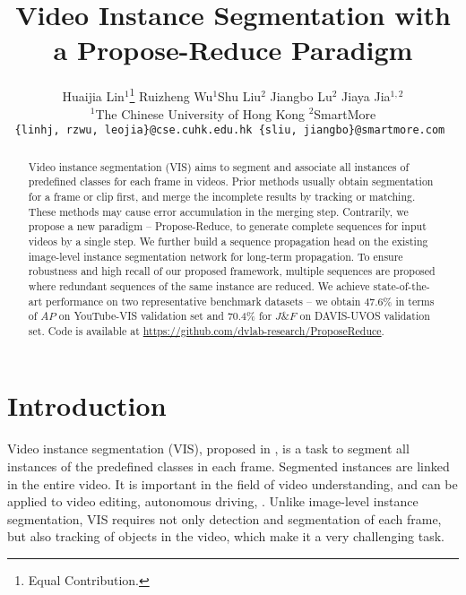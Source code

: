 \documentclass[10pt,twocolumn,letterpaper]{article}
\begin{document}
	\newcommand*\samethanks[1][\value{footnote}]{\footnotemark[#1]}
\title{Video Instance Segmentation with a Propose-Reduce Paradigm}
	
	\author{
	Huaijia Lin$^1$\thanks{Equal Contribution.} \quad Ruizheng Wu$^1$\samethanks \quad Shu Liu$^{2}$ \quad Jiangbo Lu$^{2}$ \quad Jiaya Jia$^{1,2}$  \\
	$^1$The Chinese University of Hong Kong \quad $^2$SmartMore
	\\
	\texttt{\footnotesize \{linhj, rzwu, leojia\}@cse.cuhk.edu.hk \qquad \{sliu, jiangbo\}@smartmore.com }
	}
	


	\maketitle
\ificcvfinal\thispagestyle{empty}\fi
	
\begin{abstract}
		Video instance segmentation (VIS) aims to segment and associate all instances of predefined classes for each frame in videos. 
		Prior methods usually obtain segmentation for a frame or clip first, and merge the incomplete results by tracking or matching. These methods may cause error accumulation in the merging step. 
		Contrarily, we propose a new paradigm -- Propose-Reduce, to generate complete sequences for input videos by a single step.  
		We further build a sequence propagation head on the existing image-level instance segmentation network for long-term propagation.
		To ensure robustness and high recall of our proposed framework, multiple sequences are proposed where redundant sequences of the same instance are reduced. We achieve state-of-the-art performance on two representative benchmark datasets -- we obtain 47.6\% in terms of ${AP}$ on YouTube-VIS validation set and 70.4\% for ${J\&F}$ on DAVIS-UVOS validation set. Code is available at \url{https://github.com/dvlab-research/ProposeReduce}.
	\end{abstract}
	
\section{Introduction}\label{Sec:intro}
	Video instance segmentation (VIS), proposed in \cite{yang2019vis}, is a task to segment all instances of the predefined classes in each frame. Segmented instances are linked in the entire video. It is important in the field of video understanding, and can be applied to video editing, autonomous driving, \etc. 
	Unlike image-level instance segmentation, VIS requires not only detection and segmentation of each frame, but also tracking of objects in the video, which make it a very challenging task.
	
\end{document}
